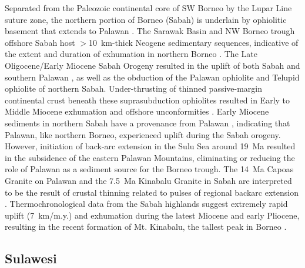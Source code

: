 \documentclass[11pt,letterpaper]{article}
\begin{document}
Separated from the Paleozoic continental core of SW Borneo by the Lupar Line suture zone, the northern portion of Borneo (Sabah) is underlain by ophiolitic basement that extends to Palawan \citep{Hall2008a, Ilao2018a}. The Sarawak Basin and NW Borneo trough offshore Sabah host $>$10~km-thick Neogene sedimentary sequences, indicative of the extent and duration of exhumation in northern Borneo \citep{Hall2008a}. The Late Oligocene/Early Miocene Sabah Orogeny resulted in the uplift of both Sabah and southern Palawan \citep{Hall2013a}, as well as the obduction of the Palawan ophiolite and Telupid ophiolite of northern Sabah. Under-thrusting of thinned passive-margin continental crust beneath these suprasubduction ophiolites resulted in Early to Middle Miocene exhumation and offshore unconformities \citep{Hall2008a}. Early Miocene sediments in northern Sabah have a provenance from Palawan \citep{Suggate2014a}, indicating that Palawan, like northern Borneo, experienced uplift during the Sabah orogeny. However, initiation of back-arc extension in the Sulu Sea around 19~Ma \citep{Hall2013a} resulted in the subsidence of the eastern Palawan Mountains, eliminating or reducing the role of Palawan as a sediment source for the Borneo trough. The 14~Ma Capoas Granite on Palawan and the 7.5~Ma Kinabalu Granite in Sabah are interpreted to be the result of crustal thinning related to pulses of regional backarc extension \citep{Hall2013a}. Thermochronological data from the Sabah highlands suggest extremely rapid uplift (7~km/m.y.) and exhumation during the latest Miocene and early Pliocene, resulting in the recent formation of Mt. Kinabalu, the tallest peak in Borneo \citep{Cottam2013a}.

\subsection*{Sulawesi}
\end{document}

